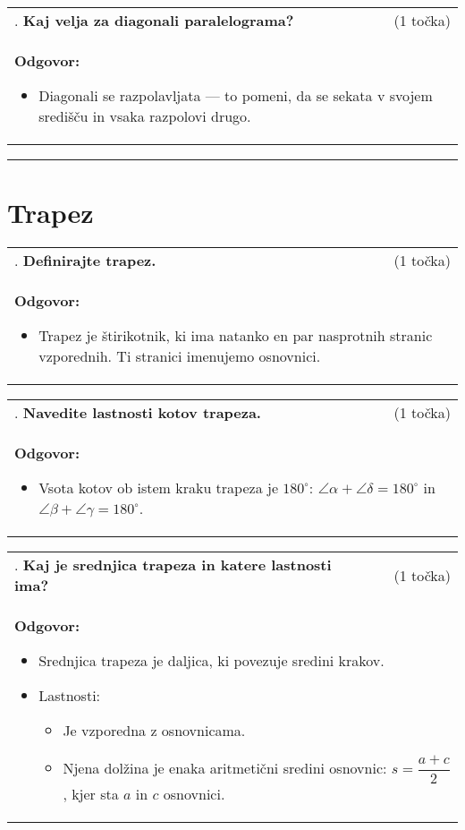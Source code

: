 \documentclass[12pt]{article}
\newcounter{vprasanje}[section]
\renewcommand{\thevprasanje}{\roman{vprasanje}}
\newcommand{\vprasanje}[2]{%
  \stepcounter{vprasanje}%
  \textbf{\thevprasanje}. \textbf{#1} & (#2) \\
}
\newcommand{\odgovor}[1]{%
  \multicolumn{2}{p{\dimexpr\textwidth-2\tabcolsep\relax}}{%
    \small \textbf{Odgovor:} #1%
  } \\[1em]%
}
\newcommand{\crta}{\rule{\textwidth}{0.4pt}}
\newcommand{\naslov}[1]{%
  \vspace{1em} 
  \section{#1}
  \addcontentsline{toc}{section}{\protect\numberline{}#1}%
}
\newcommand{\razmak}[1]{%
  \vspace{#1}
}
\begin{document}
\begin{tabularx}{\textwidth}{X r}
\vprasanje{Kaj velja za diagonali paralelograma?}{1 točka}
\odgovor{
\begin{itemize}
    \item Diagonali se razpolavljata — to pomeni, da se sekata v svojem središču in vsaka razpolovi drugo.
\end{itemize}
}
\end{tabularx}

\razmak{0.5em}


\crta

\naslov{Trapez}

\begin{tabularx}{\textwidth}{X r}
\vprasanje{Definirajte trapez.}{1 točka}
\odgovor{
\begin{itemize}
    \item Trapez je štirikotnik, ki ima natanko en par nasprotnih stranic vzporednih. Ti stranici imenujemo osnovnici.
\end{itemize}
}
\end{tabularx}

\begin{tabularx}{\textwidth}{X r}
\vprasanje{Navedite lastnosti kotov trapeza.}{1 točka}
\odgovor{
\begin{itemize}
    \item Vsota kotov ob istem kraku trapeza je $180^\circ$:  
    $\angle \alpha + \angle \delta = 180^\circ$ in $\angle \beta + \angle \gamma = 180^\circ$.
\end{itemize}
}
\end{tabularx}

\begin{tabularx}{\textwidth}{X r}
\vprasanje{Kaj je srednjica trapeza in katere lastnosti ima?}{1 točka}
\odgovor{
\begin{itemize}
    \item Srednjica trapeza je daljica, ki povezuje sredini krakov.
    \item Lastnosti:
    \begin{itemize}
        \item Je vzporedna z osnovnicama.
        \item Njena dolžina je enaka aritmetični sredini osnovnic:  
        $s = \dfrac{a + c}{2}$, kjer sta $a$ in $c$ osnovnici.
    \end{itemize}
\end{itemize}
}
\end{tabularx}
\end{document}
